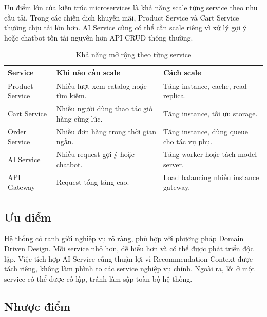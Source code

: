 \documentclass[../main.tex]{subfiles}
\begin{document}
Ưu điểm lớn của kiến trúc microservices là khả năng scale từng service theo nhu cầu tải. Trong các chiến dịch khuyến mãi, Product Service và Cart Service thường chịu tải lớn hơn. AI Service cũng có thể cần scale riêng vì xử lý gợi ý hoặc chatbot tốn tài nguyên hơn API CRUD thông thường.

\begin{table}[H]
    \centering
    \caption{Khả năng mở rộng theo từng service}
    \label{tab:chapter4-scalability}
    \begin{tabular}{|p{}|p{}|p{}|}
        \hline
        \rowcolor{primary!35}
        \textbf{Service} & \textbf{Khi nào cần scale} & \textbf{Cách scale} \\
        \hline
        Product Service & Nhiều lượt xem catalog hoặc tìm kiếm. & Tăng instance, cache, read replica. \\
        \hline
        Cart Service & Nhiều người dùng thao tác giỏ hàng cùng lúc. & Tăng instance, tối ưu storage. \\
        \hline
        Order Service & Nhiều đơn hàng trong thời gian ngắn. & Tăng instance, dùng queue cho tác vụ phụ. \\
        \hline
        AI Service & Nhiều request gợi ý hoặc chatbot. & Tăng worker hoặc tách model server. \\
        \hline
        API Gateway & Request tổng tăng cao. & Load balancing nhiều instance gateway. \\
        \hline
    \end{tabular}
\end{table}

\subsection{Ưu điểm}
\label{subsection:4.10.3}

Hệ thống có ranh giới nghiệp vụ rõ ràng, phù hợp với phương pháp Domain Driven Design. Mỗi service nhỏ hơn, dễ hiểu hơn và có thể được phát triển độc lập. Việc tích hợp AI Service cũng thuận lợi vì Recommendation Context được tách riêng, không làm phình to các service nghiệp vụ chính. Ngoài ra, lỗi ở một service có thể được cô lập, tránh làm sập toàn bộ hệ thống.

\subsection{Nhược điểm}
\label{subsection:4.10.4}
\end{document}
